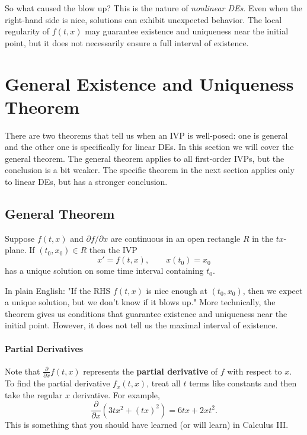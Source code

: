 \documentclass[11pt,letterpaper]{article}
\begin{document}
So what caused the blow up? This is the nature of \textit{nonlinear DEs}. Even when the right-hand side is nice, solutions can exhibit unexpected behavior. The local
regularity of $f(t,x)$ may guarantee existence and uniqueness near the
initial point, but it does not necessarily ensure a full interval of
existence.


\section{General Existence and Uniqueness Theorem}
There are two theorems that tell us when an IVP is well-posed: one is general and the other one is specifically for linear DEs. In this section we will cover the general theorem. The general theorem applies to all first-order IVPs, but the conclusion is a bit weaker. The specific theorem in the next section applies only to linear DEs, but has a stronger conclusion.

\subsection{General Theorem}
\begin{theorem}
Suppose $f(t,x)$ and $\partial f/\partial x$ are continuous in an open rectangle $R$ in the $tx$-plane. If $(t_0,x_0) \in R$ then the IVP
\[
x' = f(t,x),\qquad x(t_0)=x_0
\]
has a unique solution on some time interval containing $t_0$.
\end{theorem}
In plain English: "If the RHS $f(t,x)$ is nice enough at $(t_0,x_0)$, then we expect a unique solution, but we don't know if it blows up." More technically, the theorem gives us conditions that guarantee existence and uniqueness near the initial point. However, it does not tell us the maximal interval of existence.

\paragraph{Partial Derivatives} Note that $\frac{\partial }{\partial x}f(t,x)$ represents the \textbf{partial derivative} of $f$ with respect to $x$. To find the partial derivative $f_x(t,x)$, treat all $t$ terms like constants and then take the regular $x$ derivative. For example,
$$
\frac{\partial}{\partial x}(3tx^2 + (tx)^2)= 6tx +2xt^2.
$$
This is something that you should have learned (or will learn) in Calculus III.
\end{document}
